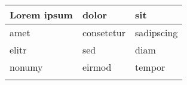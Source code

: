 ﻿\begin{longtable}[l]{|l|l|l|}
\hline
      Lorem ipsum
    & dolor
    & sit
\tabularnewline
\hline
      amet
    & consetetur
    & sadipscing
\\ \hline
      elitr
    & sed
    & diam
\tabularnewline
\hline
      nonumy
    & eirmod
    & tempor
\tabularnewline
\hline
\caption{}
\label{tab:}
\end{longtable}